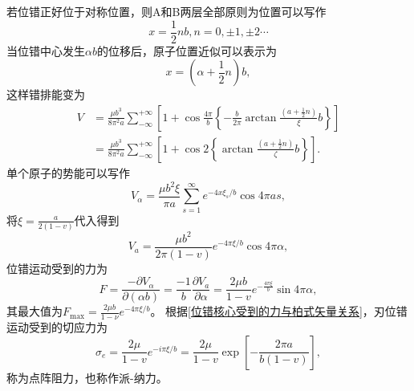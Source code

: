                若位错正好位于对称位置，则A和B两层全部原则为位置可以写作
                \begin{equation}
                    x=\frac{1}{2}nb,n=0,\pm1,\pm2\cdots
                \end{equation}
                当位错中心发生$\alpha b$的位移后，原子位置近似可以表示为
                \begin{equation}
                    x=\left( \alpha+\frac{1}{2}n \right)b,
                \end{equation}
                这样错排能变为
                \begin{equation}
                    \begin{aligned}
                        V&=\frac{\mu b^{3}}{8 \pi^{2} a} \sum_{-\infty}^{+\infty}\left[1+\cos \frac{4 \pi}{b}\left\{-\frac{b}{2 \pi} \arctan \frac{\left(a+\frac{1}{2} n\right)}{\xi} b\right\}\right] \\
                        &=\frac{\mu b^{3}}{8 \pi^{2} a} \sum_{-\infty}^{+\infty}\left[1+\cos 2\left\{\arctan \frac{\left(a+\frac{1}{2} n\right)}{\zeta} b\right\}\right].
                    \end{aligned}
                \end{equation}
                单个原子的势能可以写作
                \begin{equation}
                    V_{\alpha}=\frac{\mu b^{2} \xi}{\pi a} \sum_{s=1}^{\infty} e^{-4 x \xi_{s} / b} \cos 4 \pi a s,
                \end{equation}
                将$\xi=\frac{a}{2(1-v)}$代入得到
                \begin{equation}
                    V_{a}=\frac{\mu b^{2}}{2 \pi(1-v)} e^{-4 \pi \xi / b} \cos 4 \pi \alpha,
                \end{equation}
                位错运动受到的力为
                \begin{equation}
                    F=\frac{-\partial V_\alpha}{\partial(\alpha b)}=\frac{-1}{b}\frac{\partial V_a}{\partial\alpha}=\frac{2\mu b}{1-v}e^{-\frac{4\pi\xi}{b}}\sin{4\pi\alpha},
                \end{equation}
                其最大值为$F_{\mathrm{max}}=\frac{2 \mu b}{1-\nu} e^{-4 \pi \xi / b}$。
                根据\autoref{位错核心受到的力与柏式矢量关系}，刃位错运动受到的切应力为
                \begin{equation}
                    \sigma_{e}=\frac{2 \mu}{1-v} e^{-i \pi \xi / b}=\frac{2 \mu}{1-v} \exp \left[-\frac{2 \pi a}{b(1-v)}\right],
                \end{equation}
                称为点阵阻力，也称作派-纳力。

